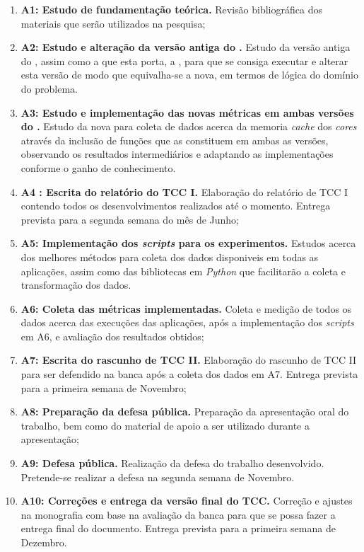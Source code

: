\documentclass[
    12pt,               %
    openright,          %
    twoside,            %
    a4paper,            %
    english,            %
    brazil,             %
    ]{abntex2}
\begin{document}
    \begin{enumerate}
        \item \textbf{A1: Estudo de fundamentação teórica.} Revisão bibliográfica dos materiais que serão utilizados na pesquisa;
        \item \textbf{A2: Estudo e alteração da versão antiga do \capb.} Estudo da versão antiga do \capb, assim como a \api que esta porta, a \ipc, para que se consiga executar e alterar esta versão de modo que equivalha-se a nova, em termos de lógica do domínio do problema.
        \item \textbf{A3: Estudo e implementação das novas métricas em ambas versões do \capb.} Estudo da nova \api para coleta de dados acerca da memoria \textit{cache} dos \textit{cores} através da inclusão de funções que as constituem em ambas as versões, observando os resultados intermediários e adaptando as implementações conforme o ganho de conhecimento.
        \item \textbf{A4 : Escrita do relatório do TCC I.} Elaboração do relatório de TCC I contendo todos os desenvolvimentos realizados até o momento. Entrega prevista para a segunda semana do mês de Junho;
        \item \textbf{A5: Implementação dos \textit{scripts} para os experimentos.} Estudos acerca dos melhores métodos para coleta dos dados disponiveis em todas as aplicações, assim como das bibliotecas em \textit{Python} que facilitarão a coleta e transformação dos dados.
        \item \textbf{A6: Coleta das métricas implementadas.} Coleta e medição de todos os dados acerca das execuções das aplicações, após a implementação dos \textit{scripts} em A6, e avaliação dos resultados obtidos;
        \item \textbf{A7: Escrita do rascunho de TCC II.} Elaboração do rascunho de TCC II para ser defendido na banca após a coleta dos dados em A7. Entrega prevista para a primeira semana de Novembro;
        \item \textbf{A8: Preparação da defesa pública.} Preparação da apresentação oral do trabalho, bem como do material de apoio a ser utilizado durante a apresentação;
        \item \textbf{A9: Defesa pública.} Realização da defesa do trabalho desenvolvido. Pretende-se realizar a defesa na segunda semana de Novembro.
        \item \textbf{A10: Correções e entrega da versão final do TCC.} Correção e ajustes na monografia com base na avaliação da banca para que se possa fazer a entrega final do documento. Entrega prevista para a primeira semana de Dezembro.
    \end{enumerate}
\end{document}
